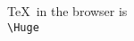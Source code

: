 \documentclass{article}
\begin{document}
\pagecolor{black}
\color{white}
\begin{center}
\huge
\TeX\ in the browser is\\ \Huge\texttt{\textbackslash Huge}
\end{center}
\end{document}
